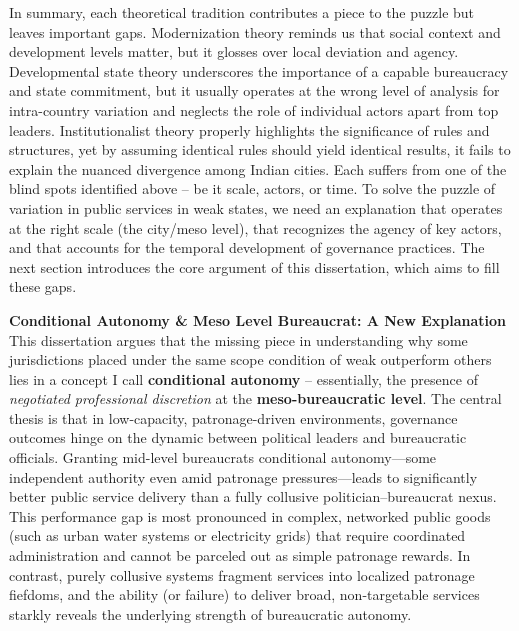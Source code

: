 In summary, each theoretical tradition contributes a piece to the puzzle but leaves important gaps. Modernization theory reminds us that social context and development levels matter, but it glosses over local deviation and agency. Developmental state theory underscores the importance of a capable bureaucracy and state commitment, but it usually operates at the wrong level of analysis for intra-country variation and neglects the role of individual actors apart from top leaders. Institutionalist theory properly highlights the significance of rules and structures, yet by assuming identical rules should yield identical results, it fails to explain the nuanced divergence among Indian cities. Each suffers from one of the blind spots identified above – be it scale, actors, or time. To solve the puzzle of variation in public services in weak states, we need an explanation that operates at the right scale (the city/meso level), that recognizes the agency of key actors, and that accounts for the temporal development of governance practices. The next section introduces the core argument of this dissertation, which aims to fill these gaps.

\textbf{Conditional Autonomy & Meso Level Bureaucrat: A New Explanation}
This dissertation argues that the missing piece in understanding why some jurisdictions placed under the same scope condition of weak outperform others lies in a concept I call \textbf{conditional autonomy} – essentially, the presence of \textit{negotiated professional discretion} at the \textbf{meso-bureaucratic level}. The central thesis is that in low-capacity, patronage-driven environments, governance outcomes hinge on the dynamic between political leaders and bureaucratic officials. Granting mid-level bureaucrats conditional autonomy—some independent authority even amid patronage pressures—leads to significantly better public service delivery than a fully collusive politician–bureaucrat nexus. This performance gap is most pronounced in complex, networked public goods (such as urban water systems or electricity grids) that require coordinated administration and cannot be parceled out as simple patronage rewards. In contrast, purely collusive systems fragment services into localized patronage fiefdoms, and the ability (or failure) to deliver broad, non-targetable services starkly reveals the underlying strength of bureaucratic autonomy.

